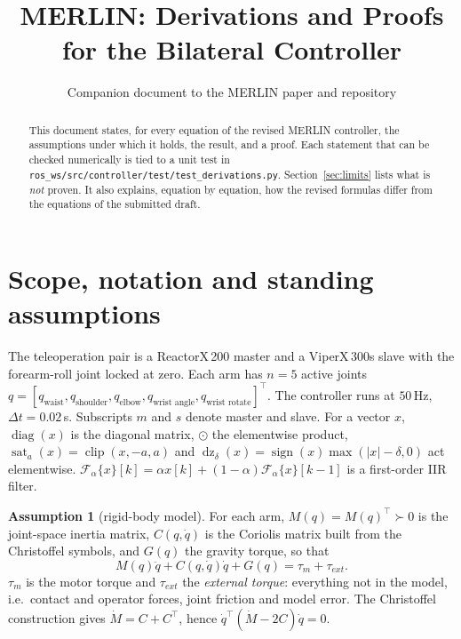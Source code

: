 \documentclass[11pt,a4paper]{article}
\title{\textbf{MERLIN: Derivations and Proofs\\for the Bilateral Controller}}
\author{Companion document to the MERLIN paper and repository}
\date{}
\theoremstyle{remark}
\theoremstyle{definition}
\newtheorem{assumption}{Assumption}
\newcommand{\diag}{\operatorname{diag}}
\newcommand{\dz}{\operatorname{dz}}
\newcommand{\sat}{\operatorname{sat}}
\newcommand{\clip}{\operatorname{clip}}
\newcommand{\sign}{\operatorname{sign}}
\begin{document}
\maketitle

\begin{abstract}\noindent
This document states, for every equation of the revised MERLIN controller, the assumptions under which it
holds, the result, and a proof. Each statement that can be checked numerically is tied to a unit test in
\texttt{ros\_ws/src/controller/test/test\_derivations.py}. Section~\ref{sec:limits} lists what is \emph{not} proven.
It also explains, equation by equation, how the revised formulas differ from the equations of the submitted draft.
\end{abstract}

\tableofcontents

\section{Scope, notation and standing assumptions}\label{sec:scope}
The teleoperation pair is a ReactorX\,200 master and a ViperX\,300s slave with the forearm-roll joint locked at zero.
Each arm has $n=5$ active joints $q=[q_{\text{waist}},q_{\text{shoulder}},q_{\text{elbow}},q_{\text{wrist angle}},q_{\text{wrist rotate}}]^\top$.
The controller runs at $50$\,Hz, $\Delta t=0.02$\,s. Subscripts $m$ and $s$ denote master and slave. For a vector $x$, $\diag(x)$ is the
diagonal matrix, $\odot$ the elementwise product, $\sat_a(x)=\clip(x,-a,a)$ and $\dz_\delta(x)=\sign(x)\max(|x|-\delta,0)$ act
elementwise. $\mathcal F_\alpha\{x\}[k]=\alpha x[k]+(1-\alpha)\mathcal F_\alpha\{x\}[k-1]$ is a first-order IIR filter.

\begin{assumption}[rigid-body model]\label{as:rb}
For each arm, $M(q)=M(q)^\top\succ0$ is the joint-space inertia matrix, $C(q,\dot q)$ is the Coriolis matrix built from the
Christoffel symbols, and $G(q)$ the gravity torque, so that
\begin{equation}\label{eq:dyn}
M(q)\ddot q+C(q,\dot q)\dot q+G(q)=\tau_m+\tau_{ext}.
\end{equation}
$\tau_m$ is the motor torque and $\tau_{ext}$ the \emph{external torque}: everything not in the model, i.e.\ contact and
operator forces, joint friction and model error. The Christoffel construction gives $\dot M=C+C^\top$, hence
$\dot q^\top(\dot M-2C)\dot q=0$.
\end{assumption}
\end{document}
